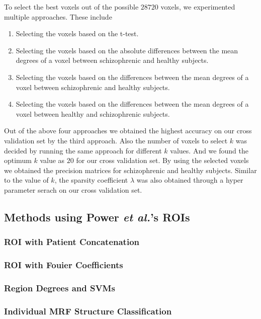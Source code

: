 \documentclass{article} %
\begin{document}
To select the best voxels out of the possible $28720$ voxels, we experimented multiple approaches. These include \begin{enumerate}
  \item Selecting the voxels based on the t-test.
  \item Selecting the voxels based on the absolute differences between the mean degrees of a voxel between schizophrenic and healthy subjects.
  \item Selecting the voxels based on the differences between the mean degrees of a voxel between schizophrenic and healthy subjects.
  \item Selecting the voxels based on the differences between the mean degrees of a voxel between healthy and schizophrenic subjects.
\end{enumerate}
Out of the above four approaches we obtained the highest accuracy on our cross validation set by the third approach. Also the number of voxels to select $k$ was decided by running the same approach for different $k$ values. And we found the optimum $k$ value as $20$ for our cross validation set. By using the selected voxels we obtained the precision matrices for schizophrenic and healthy subjects. Similar to the value of $k$, the sparsity coefficient $\lambda$ was also obtained through a hyper parameter serach on our cross validation set.

\subsection{Methods using Power \emph{et al.}'s ROIs}

\subsubsection{ROI with Patient Concatenation}

\subsubsection{ROI with Fouier Coefficients}

\subsubsection{Region Degrees and SVMs}

\subsubsection{Individual MRF Structure Classification}
\end{document}
